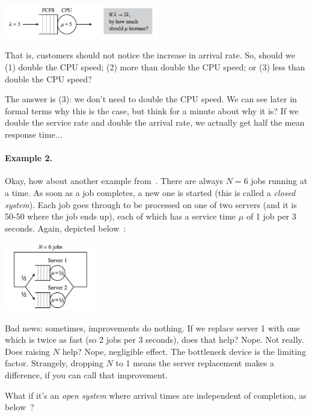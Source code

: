 \documentclass[a4paper]{report}
\begin{document}
\begin{center}
	\includegraphics[width=0.5\textwidth]{images/qt-example1.png}
\end{center}

That is, customers should not notice the increase in arrival rate. So, should we (1) double the CPU speed; (2) more than double the CPU speed; or (3) less than double the CPU speed?

The answer is (3): we don't need to double the CPU speed. We can see later in formal terms why this is the case, but think for a minute about why it is? If we double the service rate and double the arrival rate, we actually get half the mean response time...

\paragraph{Example 2.} Okay, how about another example from~\cite{pmd}. There are always $N=6$ jobs running at a time. As soon as a job completes, a new one is started (this is called a \textit{closed system}). Each job goes through to be processed on one of two servers (and it is 50-50 where the job ends up), each of which has a service time $\mu$ of 1 job per 3 seconds. Again, depicted below~\cite{pmd}:


\begin{center}
	\includegraphics[width=0.3\textwidth]{images/qt-example2.png}
\end{center}

Bad news: sometimes, improvements do nothing. If we replace server 1 with one which is twice as fast (so 2 jobs per 3 seconds), does that help? Nope. Not really. Does raising $N$ help? Nope, negligible effect. The bottleneck device is the limiting factor. Strangely, dropping $N$ to 1 means the server replacement makes a difference, if you can call that improvement. 

What if it's an \textit{open system} where arrival times are independent of completion, as below~\cite{pmd}?
\end{document}
